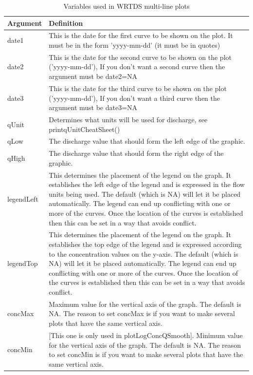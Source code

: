 \documentclass[a4paper,11pt]{article}
\begin{document}
\begin{table}[ht]
\caption{Variables used in WRTDS multi-line plots  \label{tab:wrtdsMultiVariables}}
\begin{tabularx}{\textwidth}{lX}
\hline
  \textbf{Argument} & \textbf{Definition} \\
\hline
date1 & This is the date for the first curve to be shown on the plot.  It must be in the form 'yyyy-mm-dd' (it must be in quotes)\\
date2 & This is the date for the second curve to be shown on the plot ('yyyy-mm-dd'), If you don't want a second curve then the argument must be date2=NA\\
date3 & This is the date for the third curve to be shown on the plot ('yyyy-mm-dd'), If you don't want a third curve then the argument must be date3=NA\\
qUnit & Determines what units will be used for discharge, see printqUnitCheatSheet() \\
qLow & The discharge value that should form the left edge of the graphic. \\
qHigh & The discharge value that should form the right edge of the graphic. \\
legendLeft & This determines the placement of the legend on the graph.  It establishes the left edge of the legend and is expressed in the flow units being used.  The default (which is NA) will let it be placed automatically.  The legend can end up conflicting with one or more of the curves.  Once the location of the curves is established then this can be set in a way that avoids conflict.\\
legendTop & This determines the placement of the legend on the graph.  It establishes the top edge of the legend and is expressed according to the concentration values on the y-axis.  The default (which is NA) will let it be placed automatically.  The legend can end up conflicting with one or more of the curves.  Once the location of the curves is established then this can be set in a way that avoids conflict.\\
concMax & Maximum value for the vertical axis of the graph.  The default is NA.  The reason to set concMax is if you want to make several plots that have the same vertical axis.\\
concMin & [This one is only used in plotLogConcQSmooth].  Minimum value for the vertical axis of the graph.  The default is NA.  The reason to set concMin is if you want to make several plots that have the same vertical axis.\\

\end{tabularx}
\end{table}
\end{document}
